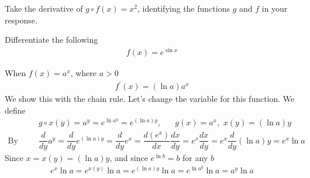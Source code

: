 \begin{exercise}
Take the derivative of $g\circ f(x) = x^{2}$,  identifying the functions $g$ and $f$ in your response. 
\end{exercise}

\begin{exercise}
Differentiate the following
\begin{align*}
    f(x) = e^{\sin x}
\end{align*}
\end{exercise}

\begin{theorem}
When $f(x) = a^{x}$, where $a > 0$
\begin{align*}
    f^{'}(x) = (\ln a)a^{x}
\end{align*}
We show this with the chain rule. Let's change the variable for this function. We define
\begin{align*}
    &g\circ x(y) = a^{y} = e^{\ln a^{y}} = e^{(\ln a)y}, \hspace{20pt} g(x) = a^{x}, \hspace{4pt} x(y) = (\ln a)y\\[2ex]
    \text{By The Chain Rule} \hspace{4pt} &\dfrac{d}{dy} a^{y} = \dfrac{d}{dy} e^{(\ln a)y} = \dfrac{d}{dy} e^{x} = \dfrac{d(e^{x})}{dx} \dfrac{dx}{dy} = e^{x}\dfrac{dx}{dy} = e^{x} \dfrac{d}{dy} (\ln a)y = e^{x} \ln a
\end{align*}
Since $x = x(y) = (\ln a)y$, and since $e^{\ln b} = b$ for any $b$
\begin{align*}
    e^{x} \ln a = e^{x(y)} \ln a = e^{(\ln a)y} \ln a = e^{\ln a^{y}} \ln a = a^{y} \ln a
\end{align*}
\end{theorem}